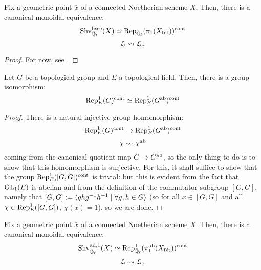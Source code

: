         \begin{definition} \label{def: m_adic_sheaves}
            
        \end{definition}
        
        \begin{definition} \label{def: l_adic_sheaves}
            
        \end{definition}
            
        \begin{theorem} \label{theorem: galois_representations_are_local_systems}
            Fix a geometric point $\bar{x}$ of a connected Noetherian scheme $X$. Then, there is a canonical monoidal equivalence:
                $$\mathrm{Shv}_{\bar{\mathbb{Q}}_{\ell}}^{\mathrm{lisse}}(X) \simeq \mathrm{Rep}_{\bar{\mathbb{Q}}_{\ell}}(\pi_1(X_{\mathrm{f\acute{e}t}}))^{\mathrm{cont}}$$
                $$\mathcal{L} \leadsto \mathcal{L}_{\bar{x}}$$
        \end{theorem}
            \begin{proof}
                For now, see \cite[Theorem 1.4.5.7]{conrad_etale_cohomology}.
            \end{proof}
        \begin{lemma} \label{lemma: abelianising_continuous_characters}
            Let $G$ be a topological group and $E$ a topological field. Then, there is a group isomorphism:
                $$\mathrm{Rep}^1_E(G)^{\mathrm{cont}} \simeq \mathrm{Rep}^1_E(G^{\mathrm{ab}})^{\mathrm{cont}}$$
        \end{lemma}
            \begin{proof}
                There is a natural injective group homomorphism:
                    $$\mathrm{Rep}^1_E(G)^{\mathrm{cont}} \to \mathrm{Rep}^1_E(G^{\mathrm{ab}})^{\mathrm{cont}}$$
                    $$\chi \leadsto \chi^{\mathrm{ab}}$$
                coming from the canonical quotient map $G \to G^{\mathrm{ab}}$, so the only thing to do is to show that this homomorphism is surjective. For this, it shall suffice to show that the group $\mathrm{Rep}^1_E([G, G])^{\mathrm{cont}}$ is trivial: but this is evident from the fact that $\operatorname{GL}_1(E)$ is abelian and from the definition of the commutator subgroup $[G, G]$, namely that $[G, G] := \langle ghg^{-1}h^{-1} \mid \forall g, h \in G\rangle$ (so for all $x \in [G, G]$ and all $\chi \in \mathrm{Rep}^1_E([G, G])$, $\chi(x) = 1$), so we are done.
            \end{proof}
        \begin{corollary} \label{coro: abelian_galois_characters_are_local_systems}
            Fix a geometric point $\bar{x}$ of a connected Noetherian scheme $X$. Then, there is a canonical monoidal equivalence:
                $$\mathrm{Shv}_{\bar{\mathbb{Q}}_{\ell}}^{\mathrm{ad}, 1}(X) \simeq \mathrm{Rep}^1_{\bar{\mathbb{Q}}_{\ell}}(\pi_1^{\mathrm{ab}}(X_{\mathrm{f\acute{e}t}}))^{\mathrm{cont}}$$
                $$\mathcal{L} \leadsto \mathcal{L}_{\bar{x}}$$
        \end{corollary}